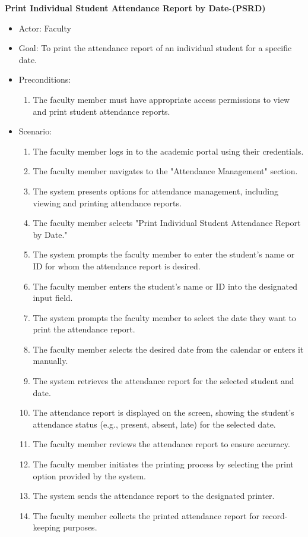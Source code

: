 \documentclass[letterpaper,12pt,oneside,listof=totoc]{scrreprt}
\begin{document}
\hfill \break
\textbf{Print Individual Student Attendance Report by Date-(PSRD)}
\begin{itemize}
    \item Actor: Faculty
    \item Goal: To print the attendance report of an individual student for a specific date.
    \item Preconditions:
    \begin{enumerate}
        \item The faculty member must have appropriate access permissions to view and print student attendance reports.
    \end{enumerate}
    \item Scenario:
    \begin{enumerate}
        \item The faculty member logs in to the academic portal using their credentials.
        \item The faculty member navigates to the "Attendance Management" section.
        \item The system presents options for attendance management, including viewing and printing attendance reports.
        \item The faculty member selects "Print Individual Student Attendance Report by Date."
        \item The system prompts the faculty member to enter the student's name or ID for whom the attendance report is desired.
        \item The faculty member enters the student's name or ID into the designated input field.
        \item The system prompts the faculty member to select the date they want to print the attendance report.
        \item The faculty member selects the desired date from the calendar or enters it manually.
        \item The system retrieves the attendance report for the selected student and date.
        \item The attendance report is displayed on the screen, showing the student's attendance status (e.g., present, absent, late) for the selected date.
        \item The faculty member reviews the attendance report to ensure accuracy.
        \item The faculty member initiates the printing process by selecting the print option provided by the system.
        \item The system sends the attendance report to the designated printer.
        \item The faculty member collects the printed attendance report for record-keeping purposes.
    \end{enumerate}
\end{itemize}
\end{document}
